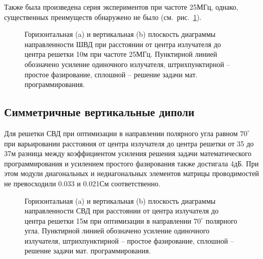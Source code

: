 Также была произведена серия экспериментов при частоте 25МГц, однако, существенных преимуществ обнаружено не было (см.~рис.~\ref{ris:bvd_mut_25_10}).

\begin{figure}
\begin{minipage}[h]{0.49\linewidth}
\end{minipage}
\hfill
\begin{minipage}[h]{0.49\linewidth}
\end{minipage}
\caption{Горизонтальная (a) и вертикальная (b) плоскость диаграммы направленности ШВД при расстоянии от центра излучателя до центра решетки 10м при частоте 25МГц. Пунктирной линией обозначено усиление одиночного излучателя, штрихпунктирной -- простое фазирование, сплошной -- решение задачи мат. программирования.}
\label{ris:bvd_mut_25_10}
\end{figure}

\subsection{Симметричные вертикальные диполи}

Для решетки СВД при оптимизации в направлении полярного угла равном $70^{\circ}$ при варьировании расстояния от центра излучателя до центра решетки от 35 до 37м разница между коэффициентом усиления решения задачи математического программирования и усилением простого фазирования также достигала 4дБ. При этом модули диагональных и недиагональных элементов матрицы проводимостей не превосходили 0.033 и 0.021См соответственно.

\begin{figure}
\begin{minipage}[h]{0.49\linewidth}
\end{minipage}
\hfill
\begin{minipage}[h]{0.49\linewidth}
\end{minipage}
\caption{Горизонтальная (a) и вертикальная (b) плоскость диаграммы направленности СВД при расстоянии от центра излучателя до центра решетки 15м при оптимизации в направлении $70^{\circ}$ полярного угла. Пунктирной линией обозначено усиление одиночного излучателя, штрихпунктирной -- простое фазирование, сплошной -- решение задачи мат. программирования.}
\label{ris:svd_mut_5_70_15}
\end{figure}

